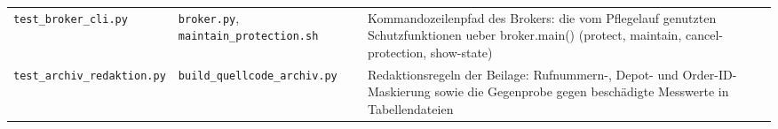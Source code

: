 \begin{longtable}{@{}p{}p{}p{}@{}}
  \texttt{test\_\allowbreak broker\_\allowbreak cli.py} & \texttt{broker.py}, \texttt{maintain\_\allowbreak protection.sh} & Kommandozeilenpfad des Brokers: die vom Pflegelauf genutzten Schutzfunktionen ueber broker.main() (protect, maintain, cancel-protection, show-state) \\
  \texttt{test\_\allowbreak archiv\_\allowbreak redaktion.py} & \texttt{build\_\allowbreak quellcode\_\allowbreak archiv.py} & Redaktionsregeln der Beilage: Rufnummern-, Depot- und Order-ID-Maskierung sowie die Gegenprobe gegen beschädigte Messwerte in Tabellendateien \\
\end{longtable}
